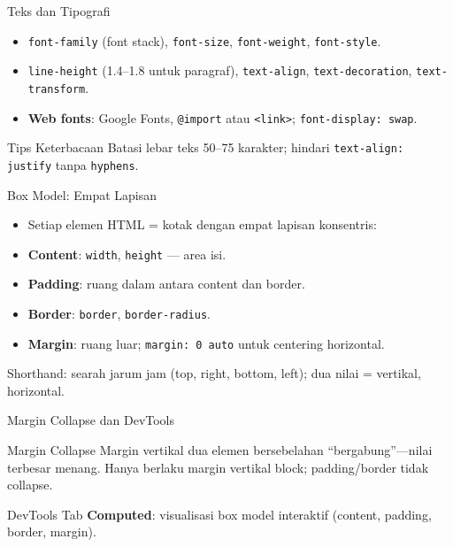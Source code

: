 \documentclass[handout]{beamer}
\begin{document}
\begin{frame}{Teks dan Tipografi}
	\begin{itemize}
		\item \texttt{font-family} (font stack), \texttt{font-size}, \texttt{font-weight}, \texttt{font-style}.
		\item \texttt{line-height} (1.4--1.8 untuk paragraf), \texttt{text-align}, \texttt{text-decoration}, \texttt{text-transform}.
		\item \textbf{Web fonts}: Google Fonts, \texttt{@import} atau \texttt{<link>}; \texttt{font-display: swap}.
	\end{itemize}
	\begin{block}{Tips Keterbacaan}
		Batasi lebar teks 50--75 karakter; hindari \texttt{text-align: justify} tanpa \texttt{hyphens}.
	\end{block}
\end{frame}

\begin{frame}{Box Model: Empat Lapisan}
	\begin{itemize}
		\item Setiap elemen HTML = kotak dengan empat lapisan konsentris:
		\item \textbf{Content}: \texttt{width}, \texttt{height} --- area isi.
		\item \textbf{Padding}: ruang dalam antara content dan border.
		\item \textbf{Border}: \texttt{border}, \texttt{border-radius}.
		\item \textbf{Margin}: ruang luar; \texttt{margin: 0 auto} untuk centering horizontal.
	\end{itemize}
	Shorthand: searah jarum jam (top, right, bottom, left); dua nilai = vertikal, horizontal.
\end{frame}

\begin{frame}{Margin Collapse dan DevTools}
	\begin{block}{Margin Collapse}
		Margin vertikal dua elemen bersebelahan ``bergabung''---nilai terbesar menang. Hanya berlaku margin vertikal block; padding/border tidak collapse.
	\end{block}
	\begin{block}{DevTools}
		Tab \textbf{Computed}: visualisasi box model interaktif (content, padding, border, margin).
	\end{block}
\end{frame}
\end{document}
